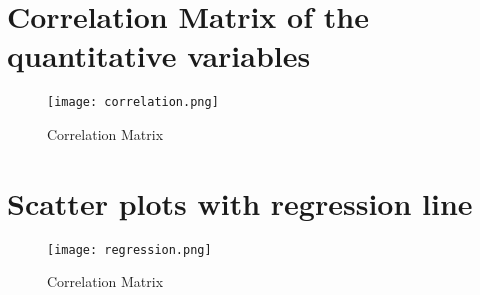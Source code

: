 \documentclass[10pt]{article}
\begin{document}
\newpage

\section{Correlation Matrix of the quantitative variables}
\begin{figure}[h]
  \centering
  \texttt{[image: correlation.png]}
  \caption{Correlation Matrix}
\end{figure}

\section{Scatter plots with regression line}
\begin{figure}[h]
  \centering
  \texttt{[image: regression.png]}
  \caption{Correlation Matrix}
\end{figure}
\end{document}
